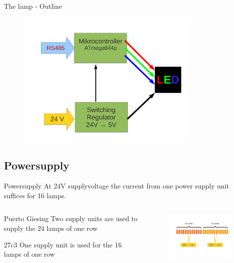\documentclass{beamer}
\begin{document}
  \begin{frame}{The lamp - Outline}
    \begin{figure}
    \begin{center}
    \includegraphics[width=9cm]{bilder/led_12v_rs485.pdf}
    \end{center}
    \end{figure}
  \end{frame}
\subsection{Powersupply}
  \begin{frame}{Powersupply}
  At 24V supplyvoltage the current from one power supply unit suffices for 16 lamps.
  \begin{columns}
    \begin{column}{4cm}
     \begin{block}{ Puerto Giesing}
     Two supply units are used to supply the 24 lamps of one row
     \end{block}
     \begin{block}{27c3}
     One supply unit is used for the 16 lamps of one row
     \end{block}
    \end{column}
    \begin{column}{7cm}
    \begin{figure}
    \includegraphics[width=7cm, clip, trim= 2.5cm 4.6cm 0.5cm 4cm]{bilder/12lampen.pdf}
    \end{figure}
    \end{column}
  \end{columns}
  \end{frame}
\end{document}
